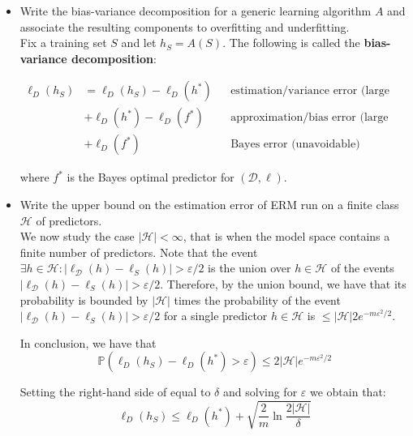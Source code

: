 \begin{itemize}
    \item Write the bias-variance decomposition for a generic learning algorithm $A$ and associate the resulting components to overfitting and underfitting.\\

       Fix a training set $S$ and let $h_S = A(S)$. The following is called the \textbf{bias-variance decomposition}:

    \begin{equation} 
            \begin{aligned}
                \ell_{D}(h_{S}) & = \ell_{D}(h_S) - \ell_{D}(h^{*}) && \text{estimation/variance error (large when overfitting)} \\ 
                                & + \ell_{D}(h^{*}) - \ell_{D}(f^{*}) && \text{approximation/bias error (large when underfitting)} \\
                                & + \ell_{D}(f^{*}) && \text{Bayes error (unavoidable)} 
            \end{aligned}
        \end{equation}

    where $f^*$ is the Bayes optimal predictor for $(\mathcal{D}, \ell)$.\\

    \item  Write the upper bound on the estimation error of ERM run on a finite class $\mathcal{H}$ of predictors.\\
        
        We now study the case $|\mathcal{H}| < \infty$, that is when the model space contains a finite number of predictors. 
        Note that the event $\exists h \in \mathcal{H} : |\ell_{\mathcal{D}}(h) - \ell_{S}(h)| > \varepsilon / 2$ is the union over $h \in \mathcal{H}$ of the events $|\ell_{\mathcal{D}}(h) - \ell_{S}(h)| > \varepsilon / 2$. 
        Therefore, by the union bound, we have that its probability is bounded by $|\mathcal{H}|$ times the probability of the event $|\ell_{\mathcal{D}}(h) - \ell_{S}(h)| > \varepsilon / 2$ for a single predictor $h \in \mathcal{H}$ is $\leq |\mathcal{H}|2e^{-m\varepsilon^2/2}$.

        In conclusion, we have that
        $$
            \mathbb{P}(\ell_{D}(h_S) - \ell_{D}(h^*) > \varepsilon) \leq 2|\mathcal{H}|e^{-m\varepsilon^2/2}
        $$
    
        Setting the right-hand side of equal to $\delta$ and solving for $\varepsilon$ we obtain that:
        $$
        \ell_{D}(h_S) \leq \ell_{D}(h^*) + \sqrt{\frac{2}{m}\ln\frac{2|\mathcal{H}|}{\delta}}
        $$


\end{itemize}
